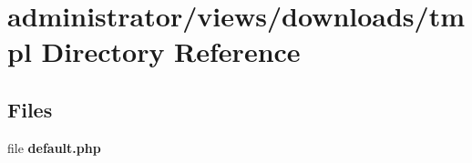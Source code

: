 \section{administrator/views/downloads/tmpl Directory Reference}
\label{dir_a8f45bc8c46f50e23fe4f53e30953f51}
\subsection*{Files}
\begin{DoxyCompactItemize}
\item 
file \textbf{ default.\+php}
\end{DoxyCompactItemize}
